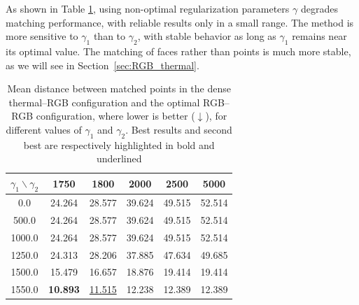 \documentclass[10pt, twocolumn]{article}
\theoremstyle{definition}
\begin{document}
{\color{black}
As shown in Table \ref{tab:RGB_dense}, using non-optimal regularization parameters $\gamma$ degrades matching performance, with reliable results only in a small range. The method is more sensitive to $\gamma_1$ than to $\gamma_2$, with stable behavior as long as $\gamma_1$ remains near its optimal value.
The matching of faces rather than points is much more stable,
as we will see in Section~\ref{sec:RGB_thermal}.
}

\begin{table}[h]
\centering
{\color{black}
\begin{tabular}{c|ccccc}
\hline
$\gamma_1 \backslash \gamma_2$ & 1750 & 1800 & 2000 & 2500 & 5000 \\
\hline
0.0    & 24.264 & 28.577 & 39.624 & 49.515 & 52.514 \\
500.0  & 24.264 & 28.577 & 39.624 & 49.515 & 52.514 \\
1000.0 & 24.264 & 28.577 & 39.624 & 49.515 & 52.514 \\
1250.0 & 24.313 & 28.206 & 37.885 & 47.634 & 49.685 \\
1500.0 & 15.479 & 16.657 & 18.876 & 19.414 & 19.414 \\
1550.0 & \textbf{10.893} & \underline{11.515} & 12.238 & 12.389 & 12.389 \\
\hline
\end{tabular}
}
\caption{Mean distance between matched points in the dense thermal--RGB configuration and the optimal RGB--RGB configuration, where lower is better ($\downarrow$), for different values of $\gamma_1$ and $\gamma_2$. Best results and second best are respectively highlighted in bold and underlined}
\label{tab:RGB_dense}
\end{table}
\end{document}
